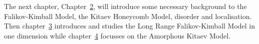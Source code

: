 The next chapter, Chapter~\protect\hyperlink{chap:2-background}{2}, will introduce some necessary background to the Falikov-Kimball Model, the Kitaev Honeycomb Model, disorder and localisation. Then chapter~\protect\hyperlink{chap:3-the-long-range-falikov-kimball-model}{3} introduces and studies the Long Range Falikov-Kimball Model in one dimension while chapter~\protect\hyperlink{chap:4-the-amorphous-kitaev-model}{4} focusses on the Amorphous Kitaev Model.

